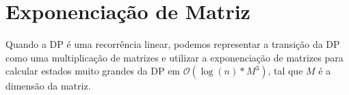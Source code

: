 \section{Exponenciação de Matriz}

Quando a DP é uma recorrência linear, podemos representar a transição da DP como uma multiplicação 
de matrizes e utilizar a exponenciação de matrizes para calcular estados muito grandes da DP em 
$\mathcal{O}(\log(n) * M^3)$, tal que $M$ é a dimensão da matriz.